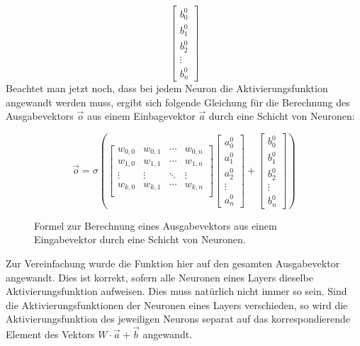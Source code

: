 \documentclass[11pt]{article}
\begin{document}
\begin{equation*}
\begin{bmatrix}
	b^0_0\\
	b^0_1\\
	b^0_2\\
	\vdots\\
	b^0_n
\end{bmatrix}
\end{equation*}
\newpage
Beachtet man jetzt noch, dass bei jedem Neuron die Aktivierungsfunktion angewandt werden muss, ergibt sich folgende Gleichung für die Berechnung des Ausgabevektors $\vec{o}$ aus einem Einbagevektor $\vec{a}$ durch eine Schicht von Neuronen:
\begin{figure}[h]
	\begin{equation*}
		\vec{o} = \sigma\left(
		\begin{bmatrix}
			w_{0,0} & w_{0,1} & \cdots & w_{0,n}\\
			w_{1,0} & w_{1,1} & \cdots & w_{1,n}\\
			\vdots & \vdots & \ddots & \vdots\\
			w_{k,0} & w_{k,1} & \cdots & w_{k,n}\\
		\end{bmatrix}
		\begin{bmatrix}
			a^0_0\\
			a^0_1\\
			a^0_2\\
			\vdots\\
			a^0_n
		\end{bmatrix}
		+
		\begin{bmatrix}
			b^0_0\\
			b^0_1\\
			b^0_2\\
			\vdots\\
			b^0_n
		\end{bmatrix}
		\right)
	\end{equation*}
	\caption{Formel zur Berechnung eines Ausgabevektors aus einem Eingabevektor durch eine Schicht von Neuronen. }
\end{figure}
\newline
Zur Vereinfachung wurde die Funktion hier auf den gesamten Ausgabevektor angewandt. Dies ist korrekt, sofern alle Neuronen eines Layers dieselbe Aktivierungsfunktion aufweisen. Dies muss natürlich nicht immer so sein. Sind die Aktivierungsfunktionen der Neuronen eines Layers verschieden, so wird die Aktivierungsfunktion des jeweiligen Neurons separat auf das korrespondierende Element des Vektors $W\cdot\vec{a}+\vec{b}$ angewandt.
\end{document}

